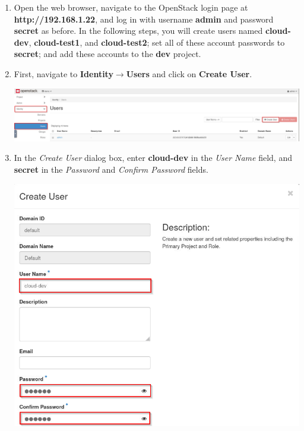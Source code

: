 \documentclass[letterpaper, 12pt]{article}
\begin{document}
\begin{enumerate}
    \item Open the web browser, navigate to the OpenStack login page at \textbf{http://192.168.1.22}, and log in with
    username \textbf{admin} and password \textbf{secret} as before. In the following steps, you will create users named
    \textbf{cloud-dev}, \textbf{cloud-test1}, and \textbf{cloud-test2}; set all of these account passwords to
    \textbf{secret}; and add these accounts to the \textbf{dev} project. 

    \item First, navigate to \textbf{Identity$\rightarrow$Users} and click on \textbf{Create User}.

    \begin{center}
        \includegraphics[width=\linewidth]{images/part3/step2.png}
    \end{center}
    
    \item In the \textit{Create User} dialog box, enter \textbf{cloud-dev} in the \textit{User Name} field, and
    \textbf{secret} in the \textit{Password} and \textit{Confirm Password} fields.

    \begin{center}
        \includegraphics[width=\linewidth]{images/part3/step3.png}
    \end{center}


\end{enumerate}
\end{document}
